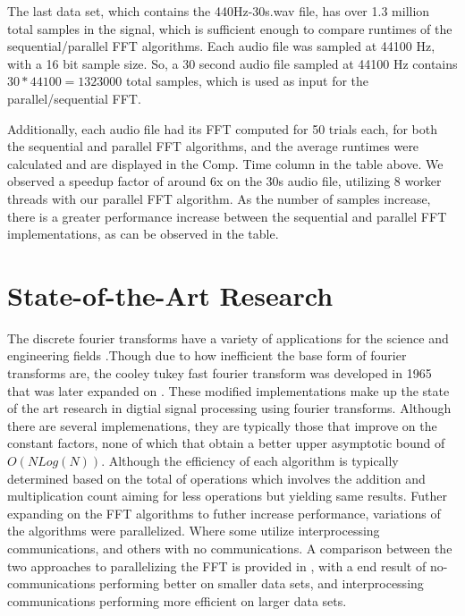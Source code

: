 \documentclass[journal]{IEEEtran}
\begin{document}
	\vspace{1em}
	\par{
		The last data set, which contains the 440Hz-30s.wav file, has over
		1.3 million total samples in the signal, which is sufficient enough
		to compare runtimes of the sequential/parallel FFT algorithms. Each
		audio file was sampled at 44100 Hz, with a 16 bit sample size. So, a 30
		second audio file sampled at 44100 Hz contains $30 * 44100 = 1323000$
		total samples, which is used as input for the parallel/sequential FFT.
	}
	\par{
		Additionally, each audio file had its FFT computed for 50 trials each, 
		for both the sequential and parallel FFT algorithms, and the 
		average runtimes were calculated and are displayed in the Comp. Time 
		column in the table above. We observed a speedup factor of 
		around 6x on the 30s audio file, utilizing 8 worker threads with our 
		parallel FFT algorithm. As the number of samples increase, 
		there is a greater performance increase between the sequential and 
		parallel FFT implementations, as can be observed in the table.
	}

\section{State-of-the-Art Research}

	\par {
		The discrete fourier transforms have a variety of applications for the 
		science and engineering fields \cite{Xiang}.Though due to how inefficient 
		the base form of fourier transforms are, the cooley tukey fast fourier transform 
		was developed in 1965 that was later expanded on \cite{CTA}. These modified implementations 
		make up the state of the art research in digtial signal processing using fourier transforms. 
		Although there are several implemenations, they are typically those that improve on the constant 
		factors, none of which that obtain a better upper asymptotic bound of ${O(N Log(N))}$. Although 
		the efficiency of each algorithm is typically determined based on the total of operations which 
		involves the addition and multiplication count aiming for less operations but yielding same results. 
		Futher expanding on the FFT algorithms to futher increase performance, variations of the algorithms 
		were parallelized. Where some utilize interprocessing communications, and others with no communications. 
		A comparison between the two approaches to parallelizing the FFT is provided in \cite{Pan}, with a 
		end result of no-communications performing better on smaller data sets, and interprocessing communications 
		performing more efficient on larger data sets.
	}
\end{document}
